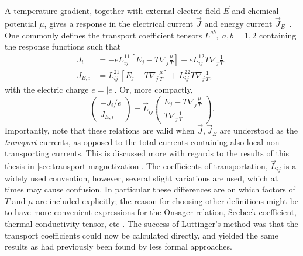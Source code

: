 A temperature gradient, together with external electric field $\vec{E}$ and chemical potential $\mu$, gives a response in the electrical current $\vec{J}$ and energy current $\vec{J}_E$~\cite{mahanManyparticlePhysics2000}.
One commonly defines the transport coefficient tensors \( L^{ab},\; a,b=1,2 \) containing the response functions such that
\begin{align}
\label{eq:17}
  J_{i} &= -e L^{11}_{ij} \left[
          E_j - T \nabla_j \frac{\mu}{T}
  \right]
  - e L^{12}_{ij} T \nabla_j \frac{1}{T},\\
  J_{E,i} &= L^{21}_{ij} \left[
          E_j - T \nabla_j \frac{\mu}{T}
  \right]
  + L^{22}_{ij} T \nabla_j \frac{1}{T},
\end{align}
with the electric charge \( e = |e| \).
Or, more compactly,
\begin{equation}
  \begin{pmatrix}
    -J_{i} /e \\ J_{E,i }
  \end{pmatrix}
  =
  \vec{L}_{ij}
  \begin{pmatrix}
    E_j - T \nabla_j \frac{\mu}{T}\\
    T \nabla_j \frac{1}{T}
  \end{pmatrix}.
\end{equation}
Importantly, note that these relations are valid when \( \vec{J}, \vec{J}_E \) are understood as the \emph{transport} currents, as opposed to the total currents containing also local non-transporting currents.
This is discussed more with regards to the results of this thesis in \cref{sec:transport-magnetization}.
The coefficients of transportation, $\vec{L}_{ij}$ is a widely used convention, however, several slight variations are used, which at times may cause confusion.
In particular these differences are on which factors of \( T \) and \( \mu \) are included explicitly;
the reason for choosing other definitions might be to have more convenient expressions for the Onsager relation, Seebeck coefficient, thermal conductivity tensor, etc \cites{mahanManyparticlePhysics2000,chernodubThermalTransportGeometry2021,lundgrenThermoelectricPropertiesWeyl2014}.
The success of Luttinger's method was that the transport coefficients could now be calculated directly, and yielded the same results as had previously been found by less formal approaches.

